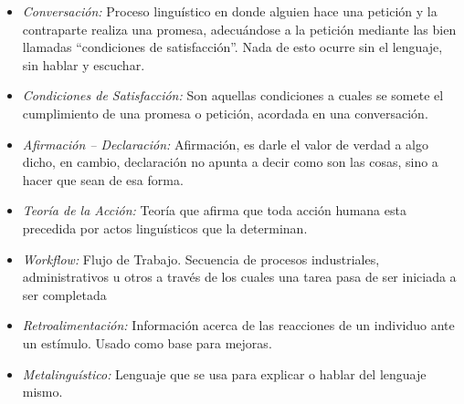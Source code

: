 \begin{itemize}
	\item \emph{Conversaci\'on:} Proceso lingu\'istico en donde alguien hace una petici\'on y la contraparte
		realiza una promesa, adecu\'andose a la petici\'on mediante las bien llamadas “condiciones de satisfacci\'on”.
		Nada de esto ocurre sin el lenguaje, sin hablar y escuchar.
	\item \emph{Condiciones de Satisfacci\'on:} Son aquellas condiciones a cuales se somete el cumplimiento de una promesa
		o petici\'on, acordada en una conversaci\'on.
	\item \emph{Afirmaci\'on – Declaraci\'on:} Afirmaci\'on, es darle el valor de verdad a algo dicho, en cambio, declaraci\'on
		no apunta a decir como son las cosas, sino a hacer que sean de esa forma.
	\item \emph{Teor\'ia de la Acci\'on:} Teor\'ia que afirma que toda acci\'on humana esta precedida por actos lingu\'isticos
		que la determinan.
	\item \emph{Workflow:} Flujo de Trabajo. Secuencia de procesos industriales, administrativos u otros a trav\'es de los cuales
		una tarea pasa de ser iniciada a ser completada
	\item \emph{Retroalimentaci\'on:} Informaci\'on acerca de las reacciones de un individuo ante un est\'imulo. Usado como
		base para mejoras.
	\item \emph{Metalingu\'istico:} Lenguaje que se usa para explicar o hablar del lenguaje mismo.
\end{itemize}
